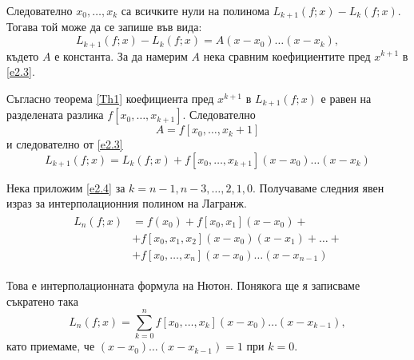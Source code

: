 \documentclass[12pt]{article}
\numberwithin{equation}{section}
\numberwithin{theorem}{section}
\numberwithin{definition}{section}
\numberwithin{corollary}{section}
\begin{document}
\par
Следователно $x_0,\dotso,x_k$ са всичките нули на полинома $L_{k+1}(f;x) - L_k(f;x)$. Тогава той може да се запише във вида:
\begin{equation} \label{e2.3}
L_{k+1}(f;x) - L_k(f;x) = A(x-x_0)\dotso(x-x_k),
\end{equation}
където $A$ е константа. За да намерим $A$ нека сравним коефициентите пред $x^{k+1}$ в \ref{e2.3}.
\par
Съгласно теорема \ref{Th1} коефициента пред $x^{k+1}$ в $L_{k+1}(f;x)$ е равен на разделената разлика $f[x_0,\dotso, x_{k+1}]$. Следователно 
\[
A = f[x_0,\dotso,x_k+1]
\]
и следователно от \ref{e2.3}
\begin{equation} \label{e2.4}
L_{k+1}(f;x) = L_k(f;x) + f[x_0,\dotso,x_{k+1}](x-x_0)\dotso(x-x_k)
\end{equation}
\par
Нека приложим \ref{e2.4} за $k=n-1,n-3,\dotso,2,1,0$. Получаваме следния явен израз за интерполационния полином на Лагранж.
\begin{align*}
\begin{split}
L_n(f;x) &= f(x_0) + f[x_0,x_1](x-x_0) +\\&+f[x_0,x_1,x_2](x-x_0)(x-x_1)+\dotso+\\&+f[x_0,\dotso,x_n](x-x_0)\dotso(x-x_{n-1})
\end{split}
\end{align*}
\par
Това е интерполационната формула на Нютон. Понякога ще я записваме съкратено така
\begin{equation}\label{e2.5}
L_n(f;x) = \displaystyle\sum_{k=0}^nf[x_0,\dotso,x_k](x-x_0)\dotso(x-x_{k-1}),
\end{equation}
като приемаме, че $(x-x_0)\dotso(x-x_{k-1}) = 1$ при $k=0$.
\end{document}
